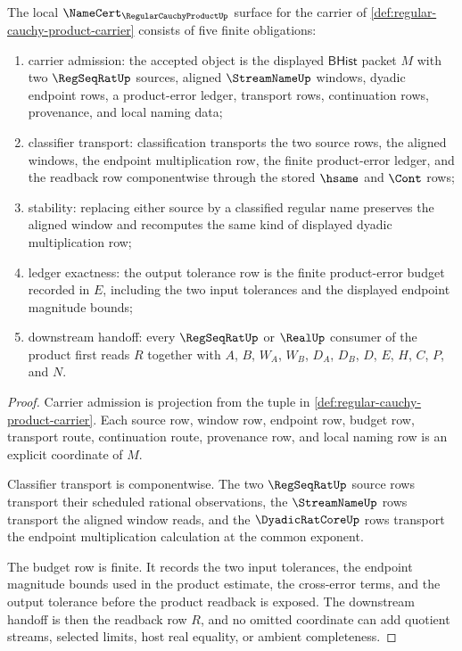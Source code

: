 \begin{theorem}
\label{thm:regular-cauchy-product-namecert-obligations}
The local $\NameCert_{\RegularCauchyProductUp}$ surface for the carrier of \autoref{def:regular-cauchy-product-carrier} consists of five finite obligations:
\begin{enumerate}
\item carrier admission: the accepted object is the displayed $\mathsf{BHist}$ packet $M$ with two $\RegSeqRatUp$ sources, aligned $\StreamNameUp$ windows, dyadic endpoint rows, a product-error ledger, transport rows, continuation rows, provenance, and local naming data;
\item classifier transport: classification transports the two source rows, the aligned windows, the endpoint multiplication row, the finite product-error ledger, and the readback row componentwise through the stored $\hsame$ and $\Cont$ rows;
\item stability: replacing either source by a classified regular name preserves the aligned window and recomputes the same kind of displayed dyadic multiplication row;
\item ledger exactness: the output tolerance row is the finite product-error budget recorded in $E$, including the two input tolerances and the displayed endpoint magnitude bounds;
\item downstream handoff: every $\RegSeqRatUp$ or $\RealUp$ consumer of the product first reads $R$ together with $A$, $B$, $W_A$, $W_B$, $D_A$, $D_B$, $D$, $E$, $H$, $C$, $P$, and $N$.
\end{enumerate}
\end{theorem}
\begin{proof}
Carrier admission is projection from the tuple in \autoref{def:regular-cauchy-product-carrier}. Each source row, window row, endpoint row, budget row, transport route, continuation route, provenance row, and local naming row is an explicit coordinate of $M$.

Classifier transport is componentwise. The two $\RegSeqRatUp$ source rows transport their scheduled rational observations, the $\StreamNameUp$ rows transport the aligned window reads, and the $\DyadicRatCoreUp$ rows transport the endpoint multiplication calculation at the common exponent.

The budget row is finite. It records the two input tolerances, the endpoint magnitude bounds used in the product estimate, the cross-error terms, and the output tolerance before the product readback is exposed. The downstream handoff is then the readback row $R$, and no omitted coordinate can add quotient streams, selected limits, host real equality, or ambient completeness.
\end{proof}

